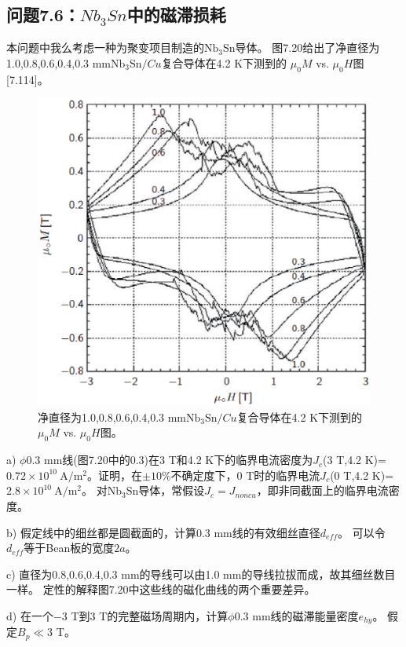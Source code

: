 \subsection{问题7.6：$Nb_3Sn$中的磁滞损耗}
本问题中我么考虑一种为聚变项目制造的$\mathrm{Nb_3 Sn}$导体。
图7.20给出了净直径为1.0,0.8,0.6,0.4,0.3 mm$\mathrm{Nb_3 Sn}/Cu$复合导体在4.2 K下测到的
$\mu_0 M$ vs. $\mu_0 H$图[7.114]。
\begin{figure}[htbp]
	\centering
	\includegraphics[scale=0.6]{chpt7/figs/fig7.20.eps}
	\caption{净直径为1.0,0.8,0.6,0.4,0.3 mm$\mathrm{Nb_3 Sn}/Cu$复合导体在4.2 K下测到的
		$\mu_0 M$ vs. $\mu_0 H$图。}
\end{figure}

a) $\phi$0.3 mm线(图7.20中的0.3)在3 T和4.2 K下的临界电流密度为$J_c$(3 T,4.2 K)=$0.72\times 10^{10}\ \mathrm{ A/m^2}$。证明，在$\pm 10\%$不确定度下，0 T时的临界电流$J_c$(0 T,4.2 K)=$2.8\times 10^{10}\ \mathrm{ A/m^2}$。
对$\mathrm{Nb_3 Sn}$导体，常假设$J_c=J_{noncu}$，即非同截面上的临界电流密度。

b) 假定线中的细丝都是圆截面的，计算0.3 mm线的有效细丝直径$d_{eff}$。
可以令$d_{eff}$等于Bean板的宽度$2a$。

c) 直径为0.8,0.6,0.4,0.3 mm的导线可以由1.0 mm的导线拉拔而成，故其细丝数目一样。
定性的解释图7.20中这些线的磁化曲线的两个重要差异。

d) 在一个$-3$ T到3 T的完整磁场周期内，计算$\phi$0.3 mm线的磁滞能量密度$e_{hy}$。
假定$B_p\ll$3 T。

